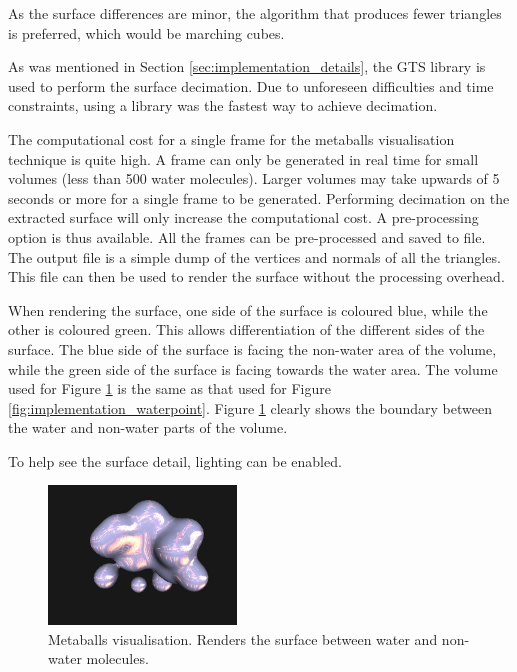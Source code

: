 As the surface differences are minor, the algorithm that produces fewer
triangles is preferred, which would be marching cubes.



As was mentioned in Section \ref{sec:implementation_details}, the GTS library
is used to perform the surface decimation. Due to unforeseen difficulties and
time constraints, using a library was the fastest way to achieve decimation.

The computational cost for a single frame for the metaballs visualisation
technique is quite high. A frame can only be generated in real time for small
volumes (less than 500 water molecules). Larger volumes may take upwards of 5
seconds or more for a single frame to be generated. Performing decimation on
the extracted surface will only increase the computational cost. A
pre-processing option is thus available. All the frames can be pre-processed
and saved to file. The output file is a simple dump of the vertices and normals
of all the triangles. This file can then be used to render the surface without
the processing overhead.

When rendering the surface, one side of the surface is coloured blue, while the
other is coloured green. This allows differentiation of the different sides of
the surface. The blue side of the surface is facing the non-water area of the
volume, while the green side of the surface is facing towards the water area.
The volume used for Figure \ref{fig:implementation_metaballs} is the same as
that used for Figure \ref{fig:implementation_waterpoint}. Figure
\ref{fig:implementation_metaballs} clearly shows the boundary between the water
and non-water parts of the volume.

To help see the surface detail, lighting can be enabled.

\begin{figure}
  \begin{center}
    \includegraphics[width=50mm]{metaballs}
  \end{center}
  \caption{Metaballs visualisation. Renders the surface between water and
  non-water molecules.}
  \label{fig:implementation_metaballs}
\end{figure}

